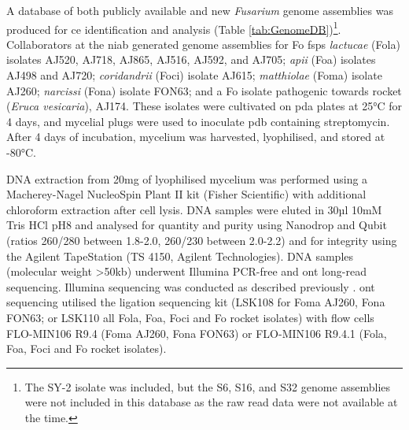 A database of both publicly available and new \textit{Fusarium} genome assemblies was produced for \ac{ce} identification and analysis (Table \ref{tab:GenomeDB})\footnote{The SY-2 isolate was included, but the S6, S16, and S32 genome assemblies were not included in this database as the raw read data were not available at the time.}. Collaborators at the \ac{niab} generated genome assemblies for \ac{Fo} \acp{fsp} \textit{lactucae} (\acs{Fola}) isolates AJ520, AJ718, AJ865, AJ516, AJ592, and AJ705; \textit{apii} (\acs{Foa}) isolates AJ498 and AJ720; \textit{coridandrii} (\acs{Foci}) isolate AJ615; \textit{matthiolae} (\acs{Foma}) isolate AJ260; \textit{narcissi} (\acs{Fona}) isolate FON63; and a \ac{Fo} isolate pathogenic towards rocket (\textit{Eruca vesicaria}), AJ174. These isolates were cultivated on \ac{pda} plates at 25°C for 4 days, and mycelial plugs were used to inoculate \ac{pdb} containing streptomycin. After 4 days of incubation, mycelium was harvested, lyophilised, and stored at -80°C. 

DNA extraction from 20mg of lyophilised mycelium was performed using a Macher\-ey-Nagel NucleoSpin Plant II kit (Fisher Scientific) with additional chloroform extraction after cell lysis. DNA samples were eluted in 30µl 10mM Tris HCl pH8 and analysed for quantity and purity using Nanodrop and Qubit (ratios 260/280 between 1.8-2.0, 260/230 between 2.0-2.2)  and for integrity using the Agilent TapeStation (TS 4150, Agilent Technologies). DNA samples (molecular weight >50kb) underwent Illumina PCR-free and \ac{ont} long-read sequencing. Illumina sequencing was conducted as described previously \parencite{Armitage2018}. \ac{ont} sequencing utilised the ligation sequencing kit (LSK108 for \ac{Foma} AJ260, \ac{Fona} FON63; or LSK110 all \ac{Fola}, \ac{Foa}, \ac{Foci} and \ac{Fo} rocket isolates) with flow cells FLO-MIN106 R9.4 (\ac{Foma} AJ260, \ac{Fona} FON63) or FLO-MIN106 R9.4.1 (\ac{Fola}, \ac{Foa}, \ac{Foci} and \ac{Fo} rocket isolates). 

